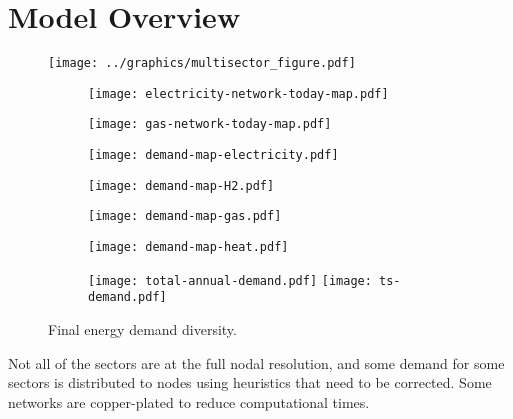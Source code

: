 \section{Model Overview}

\begin{figure}
    \centering
    \texttt{[image: ../graphics/multisector\_figure.pdf]}
\end{figure}

\begin{figure}
    \centering
    \begin{subfigure}[t]{0.49\textwidth}
        \centering
        \texttt{[image: electricity-network-today-map.pdf]}
    \end{subfigure}
    \begin{subfigure}[t]{0.49\textwidth}
        \centering
        \texttt{[image: gas-network-today-map.pdf]}
    \end{subfigure}
    \begin{subfigure}[t]{0.49\textwidth}
        \centering
        \texttt{[image: demand-map-electricity.pdf]}
    \end{subfigure}
    \begin{subfigure}[t]{0.49\textwidth}
        \centering
        \texttt{[image: demand-map-H2.pdf]}
    \end{subfigure}
    \begin{subfigure}[t]{0.49\textwidth}
        \centering
        \texttt{[image: demand-map-gas.pdf]}
    \end{subfigure}
    \begin{subfigure}[t]{0.49\textwidth}
        \centering
        \texttt{[image: demand-map-heat.pdf]}
    \end{subfigure}
    \begin{subfigure}[t]{\textwidth}
        \centering
        \texttt{[image: total-annual-demand.pdf]}
        \texttt{[image: ts-demand.pdf]}
    \end{subfigure}
    \caption{Final energy demand diversity.}
    \label{fig:demand-space}
\end{figure}

Not all of the sectors are at the full nodal resolution, and some demand for
some sectors is distributed to nodes using heuristics that need to be corrected.
Some networks are copper-plated to reduce computational times.


